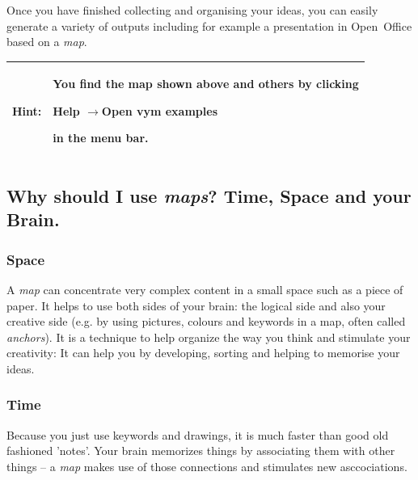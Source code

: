 \documentclass[12pt,a4paper]{article}
\newcommand{\hint}[1]{
    \begin{center} 
        \begin{tabular}{|rp{12cm}|} \hline
            {\bf Hint}:& #1\\   \hline
        \end{tabular}
            \marginpar{\Huge !} 
    \end{center} 
}
\newcommand{\ra}{$\longrightarrow$}
\begin{document}
Once you have finished collecting and organising your ideas, you can
easily generate a variety of outputs including for example a
presentation in Open~Office based on a {\em map}.

\hint{You find the map shown above and others by clicking
\begin{center}Help \ra Open vym examples\end{center} in the menu bar.}

\subsection{Why should I use {\em maps}? Time, Space and your Brain.}
\subsubsection*{Space}
A {\em map} can concentrate very complex content in a small space such
as a piece of paper. It helps to use both sides of your brain: the
logical side and also your creative side (e.g. by using pictures,
colours and keywords in a map, often called {\em anchors}).  It is a
technique to help organize the way you think and stimulate your
creativity: It can help you by developing, sorting and helping to
memorise your ideas. 

\subsubsection*{Time}
Because you just use keywords and drawings, it is much faster than good
old fashioned 'notes'. Your brain memorizes things by associating them
with other things -- a {\em map} makes use of those connections and
stimulates new asccociations. 
\end{document}
